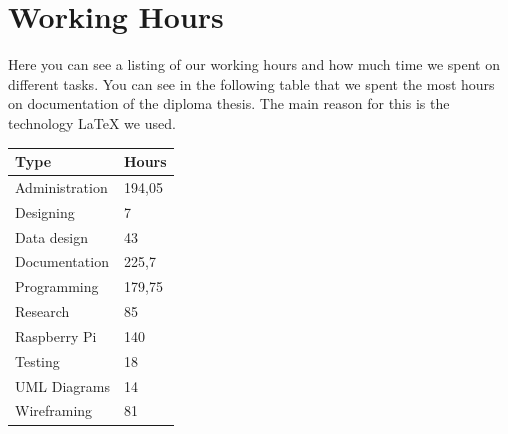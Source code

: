 \section{Working Hours}
Here you can see a listing of our working hours and how much time we spent on different tasks. You can see in the following table that we spent the most hours on documentation of the diploma thesis. The main reason for this is the technology LaTeX we used. \newline
\begin{center}
\begin{tabular}{p{5cm}p{2cm}}
\toprule
\textbf{Type} & \textbf{Hours} \\
\midrule
Administration & 194,05 \\
Designing & 7 \\
Data design & 43 \\
Documentation & 225,7 \\
Programming & 179,75 \\
Research & 85 \\
Raspberry Pi & 140 \\
Testing & 18 \\
UML Diagrams & 14 \\
Wireframing & 81 \\
\bottomrule
\end{tabular}
\end{center}
\clearpageauthor